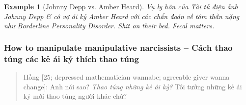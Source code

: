 \documentclass[12pt,twoside]{book}
\newtheorem{example}{Example}
\begin{document}
\begin{example}[{\sc Johnny Depp} vs. Amber Heard]
	Vụ ly hôn của Tài tử điện ảnh {\sc Johnny Depp} \& cô vợ ái kỷ Amber Heard với các chẩn đoán về tâm thần nặng như Borderline Personality Disorder. Shit on their bed. Fecal matters.
\end{example}

\subsubsection{How to manipulate manipulative narcissists -- Cách thao túng các kẻ ái kỷ thích thao túng}

\begin{quote}
	{\sf Hồng [25; depressed mathematician wannabe; agreeable giver wanna change]}: Anh nói sao? {\it Thao túng những kẻ ái kỷ?} Tôi tưởng những kẻ ái kỷ mới thao túng người khác chứ?
	

\end{quote}
\end{document}

